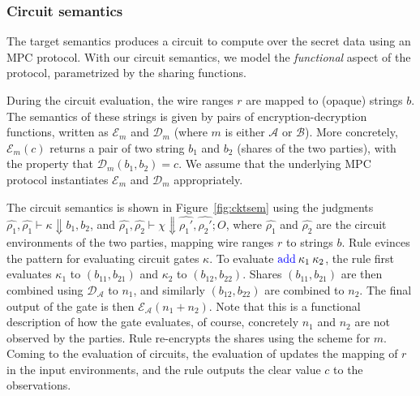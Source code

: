 \subsubsection*{Circuit semantics} The target semantics produces a
circuit to compute over the secret data using an MPC protocol. With
our circuit semantics, we model the \emph{functional} aspect of the
protocol, parametrized by the sharing functions.

During the circuit evaluation, the wire ranges $r$ are
mapped to (opaque) strings $b$. The semantics of these strings is
given by pairs of encryption-decryption functions, written as
$\mathcal{E}_{m}$ and $\mathcal{D}_{m}$ (where $m$ is either
$\mathcal{A}$ or $\mathcal{B}$). More concretely,
$\mathcal{E}_{m}(c)$ returns a pair of two string $b_{1}$ and $b_{2}$
(shares of the two parties), with the property that
$\mathcal{D}_{m}(b_{1}, b_{2}) = c$. We assume that the underlying MPC
protocol instantiates $\mathcal{E}_{m}$ and $\mathcal{D}_{m}$
appropriately.

The circuit semantics is shown in Figure~\ref{fig:cktsem} using the
judgments $\widehat{\rho_{1}}, \widehat{\rho_{1}} \vdash \kappa
\Downarrow b_{1}, b_{2}$, and $\widehat{\rho_{1}}, \widehat{\rho_{2}}
\vdash \chi \Downarrow \widehat{\rho_{1}'}, \widehat{\rho_{2}'}; O$,
where $\widehat{\rho_{1}}$ and $\widehat{\rho_{2}}$ are the circuit
environments of the two parties, mapping wire ranges $r$ to strings
$b$. Rule {} evinces the pattern for evaluating circuit
gates $\kappa$. To evaluate $\kw{add}\:\kappa_{1}\:\kappa_{2}$, the
rule first evaluates $\kappa_{1}$ to $(b_{11}, b_{21})$ and
$\kappa_{2}$ to $(b_{12}, b_{22})$. Shares $(b_{11}, b_{21})$ are then
combined using $\mathcal{D_{\mathcal{A}}}$ to $n_{1}$, and similarly
$(b_{12}, b_{22})$ are combined to $n_{2}$. The final output of the
 gate is then $\mathcal{E}_{\mathcal{A}}(n_{1} + n_{2})$. Note
that this is a functional description of how the  gate
evaluates, of course, concretely $n_{1}$ and $n_{2}$ are not observed
by the parties. Rule {} re-encrypts the shares using the
scheme for $m$. Coming to the evaluation of circuits, the evaluation
of  updates the mapping of $r$ in the input environments, and
the rule {} outputs the clear value $c$ to the observations.

